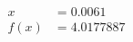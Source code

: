 \documentclass[preview]{standalone}
\begin{document}
\begin{align*}
x &= 0.0061\\f(x) &= 4.0177887
\end{align*}
\end{document}
